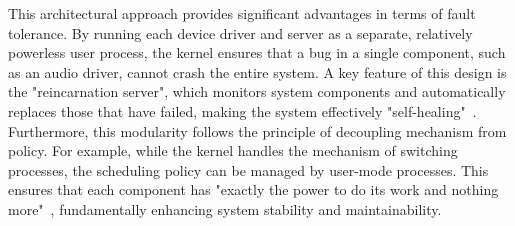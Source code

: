 \documentclass[a4paper,10pt,twoside]{report}
\theoremstyle{definition}
\begin{document}
This architectural approach provides significant advantages in terms of fault tolerance. By running each device driver and server as a separate, relatively powerless user process, the kernel ensures that a bug in a single component, such as an audio driver, cannot crash the entire system. A key feature of this design is the "reincarnation server", which monitors system components and automatically replaces those that have failed, making the system effectively "self-healing"~\cite{tanenbaum2015modern}. Furthermore, this modularity follows the principle of decoupling mechanism from policy. For example, while the kernel handles the mechanism of switching processes, the scheduling policy can be managed by user-mode processes. This ensures that each component has "exactly the power to do its work and nothing more"~\cite{tanenbaum2015modern}, fundamentally enhancing system stability and maintainability.
\end{document}
